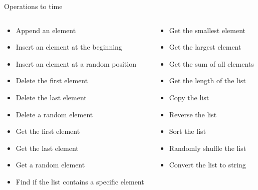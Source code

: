 \begin{frame}{Operations to time}
    \footnotesize
    \begin{columns}
        \begin{column}{0.45\textwidth}
            \begin{itemize}
                \item Append an element
                \item Insert an element at the beginning
                \item Insert an element at a random position
                \item Delete the first element
                \item Delete the last element
                \item Delete a random element
                \item Get the first element
                \item Get the last element
                \item Get a random element
                \item Find if the list contains a specific element
            \end{itemize}
        \end{column}
        \begin{column}{0.45\textwidth}
            \begin{itemize}
                \item Get the smallest element
                \item Get the largest element
                \item Get the sum of all elements
                \item Get the length of the list
                \item Copy the list
                \item Reverse the list
                \item Sort the list
                \item Randomly shuffle the list
                \item Convert the list to string
            \end{itemize}
        \end{column}
    \end{columns}
\end{frame}
